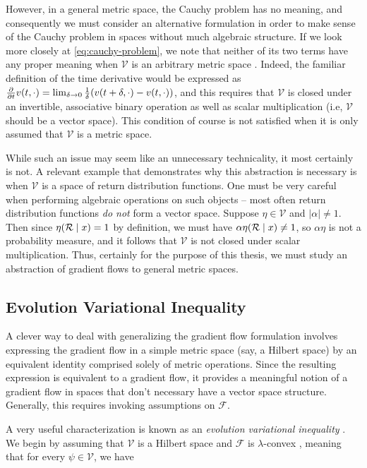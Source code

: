 However, in a general metric space, the Cauchy problem has no meaning, and
consequently we must consider an alternative formulation in order to make sense
of the Cauchy problem in spaces without much algebraic structure. If we look
more closely at \eqref{eq:cauchy-problem}, we note that
neither of its two terms have any proper meaning when $\mathcal{V}$ is an
arbitrary metric space \citep{ambrosio2008gradient}.
Indeed, the familiar definition of the time derivative
would be expressed as $\frac{\partial }{\partial t}v(t, \cdot) = \lim_{\delta\to
0}\frac{1}{\delta}(v(t + \delta, \cdot) - v(t, \cdot))$, and this requires
that $\mathcal{V}$ is closed under an invertible, associative binary operation
as well as scalar multiplication
(i.e, $\mathcal{V}$ should be a vector space). This condition of course is not
satisfied when it is only assumed that $\mathcal{V}$ is a metric space.

While such an issue may seem like an unnecessary technicality, it most certainly
is not. A relevant example that demonstrates why this abstraction is necessary
is when $\mathcal{V}$ is a space of return distribution functions. One must be
very careful when performing algebraic operations on such objects -- most often
return distribution functions \emph{do not} form a vector space. Suppose
$\eta\in\mathcal{V}$ and $|\alpha|\neq 1$. Then since $\eta(\operatorname{\mathcal{R}}\mid x)
= 1$ by definition, we must have $\alpha\eta(\operatorname{\mathcal{R}}\mid x)\neq 1$, so
$\alpha\eta$ is not a probability measure, and it follows that $\mathcal{V}$ is
not closed under scalar multiplication. Thus, certainly for the purpose of this
thesis, we must study an abstraction of gradient flows to general metric spaces.

\subsection{Evolution Variational Inequality}\label{s:gradient-flows:evi}
A clever way to deal with generalizing the gradient flow formulation involves
expressing the gradient flow in a simple metric space (say, a Hilbert space) by
an equivalent identity comprised solely of metric operations. Since the
resulting expression is equivalent to a gradient flow, it provides a meaningful
notion of a gradient flow in spaces that don't necessary have a vector space
structure. Generally, this
requires invoking assumptions on $\mathscr{F}$.

A very useful characterization is known as an \emph{evolution variational
inequality} \citep{de1980problems}. We begin by assuming that $\mathcal{V}$ is a
Hilbert space and $\mathscr{F}$ is
$\lambda$-convex \citep{santambrogio2015optimal}, meaning that for every
$\psi\in\mathcal{V}$, we have

